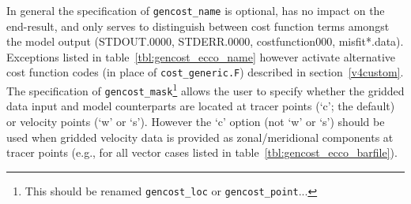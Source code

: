 In general the specification of \texttt{gencost\_name} is optional, has no impact on the end-result, and only serves to distinguish between cost function terms amongst the model output (STDOUT.0000, STDERR.0000, costfunction000, misfit*.data). Exceptions listed in table~\ref{tbl:gencost_ecco_name} however activate alternative cost function codes (in place of \texttt{cost\_generic.F}) described in section~\ref{v4custom}. The specification of \texttt{gencost\_mask}\footnote{This should be renamed \texttt{gencost\_loc} or \texttt{gencost\_point}...} allows the user to specify whether the gridded data input and model counterparts are located at tracer points (`c'; the default) or velocity points (`w' or `s'). However the `c' option (not `w' or `s') should be used when gridded velocity data is provided as zonal/meridional components at tracer points (e.g., for all vector cases listed in table~\ref{tbl:gencost_ecco_barfile}). 

